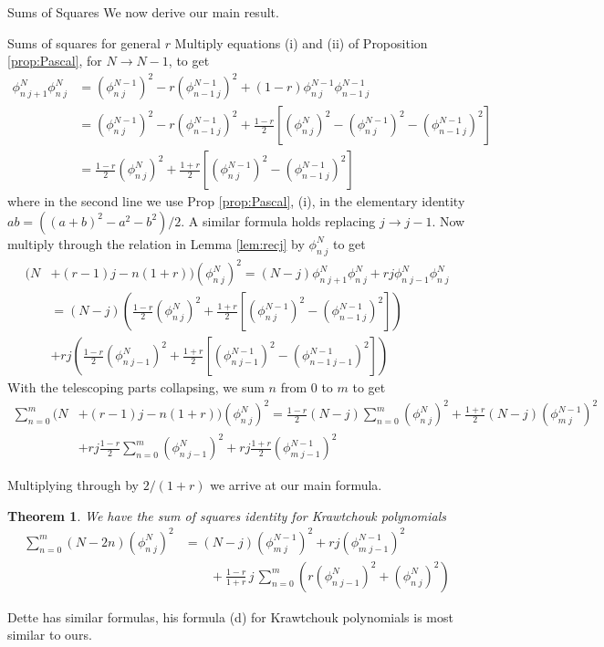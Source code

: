 \documentclass[12pt,reqno]{amsart}
\newtheorem{theorem}{Theorem}[section]   %
\newcommand{\ff}[2]{\phi^{#1}_{#2}}
\begin{document}
\begin{section}{Sums of Squares}
We now derive our main result.
\begin{subsection}{Sums of squares for general $r$}
Multiply equations (i) and (ii) of Proposition \ref{prop:Pascal}, for $N \rightarrow N-1$, to get
\begin{align*}
\ff {N}{n\;j+1}\ff {N}{n\;j} &=(\ff {N-1}{n\;j})^2-r (\ff {N-1}{n-1\;j})^2+(1-r)\ff {N-1}{n\;j}\ff {N-1}{n-1\;j}\\
&=(\ff {N-1}{n\;j})^2-r (\ff {N-1}{n-1\;j})^2+\frac{1-r}{2}\left[(\ff {N}{n\;j})^2-(\ff {N-1}{n\;j})^2-(\ff {N-1}{n-1\;j})^2\right]\\
&=\frac{1-r}{2}(\ff {N}{n\;j})^2+\frac{1+r}{2}\left[(\ff {N-1}{n\;j})^2-(\ff {N-1}{n-1\;j})^2\right]
\end{align*}
where in the second line we use Prop \ref{prop:Pascal}, (i), in the elementary identity $ab=((a+b)^2-a^2-b^2)/2$. 
A similar formula holds replacing $j\rightarrow j-1$. Now multiply through the relation in Lemma \ref{lem:recj} by $\ff {N}{n\;j}$ to get
\begin{align*}
(N&+(r-1)j-n(1+r))(\ff N{n\;j})^2=(N-j)\ff N{n\;j+1}\ff N{n\;j}+rj \ff N{n\;j-1} \ff N{n\;j}\\
&=(N-j)\left(\frac{1-r}{2}(\ff {N}{n\;j})^2+\frac{1+r}{2}\left[(\ff {N-1}{n\;j})^2-(\ff {N-1}{n-1\;j})^2\right]\right)\\
&+rj\left(\frac{1-r}{2}(\ff {N}{n\;j-1})^2+\frac{1+r}{2}\left[(\ff {N-1}{n\;j-1})^2-(\ff {N-1}{n-1\;j-1})^2\right]\right)
\end{align*}
With the telescoping parts collapsing, we sum $n$ from $0$ to $m$ to get
\begin{align*}
\sum_{n=0}^m (N&+(r-1)j-n(1+r))(\ff N{n\;j})^2=\frac{1-r}{2}(N-j)\sum_{n=0}^m (\ff {N}{n\;j})^2+\frac{1+r}{2}(N-j) (\ff {N-1}{m\;j})^2      \\
&+rj\frac{1-r}{2}\sum_{n=0}^m (\ff {N}{n\;j-1})^2+rj\frac{1+r}{2}(\ff {N-1}{m\;j-1})^2
\end{align*}

Multiplying through by $2/(1+r)$ we arrive at our main formula.

\begin{theorem} \label{thm:sqsum} We have the sum of squares identity for Krawtchouk polynomials
\begin{align*}
\sum_{n=0}^m (N-2n)(\ff N{n\;j})^2&=(N-j)(\ff {N-1}{m\;j})^2+rj(\ff {N-1}{m\;j-1})^2\\
&\qquad +\frac{1-r}{1+r}\,j\,\sum_{n=0}^m \left(r(\ff N{n\;j-1})^2+(\ff N{n\;j})^2\right)
\end{align*}

\end{theorem}

Dette \cite{D1} has similar formulas, his formula (d) for Krawtchouk polynomials is most similar to ours.
\end{subsection}
\end{section}
\end{document}
